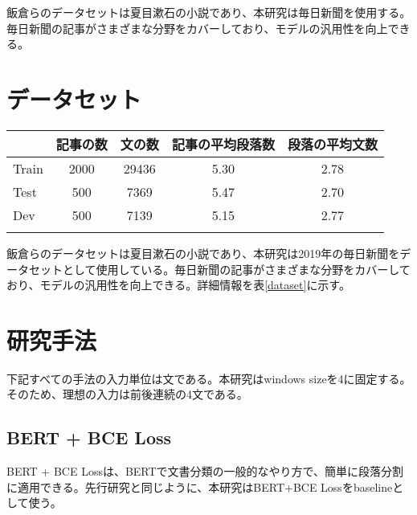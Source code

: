\documentclass[
  platex, dvipdfmx,  %
]{nlp2021}
\begin{document}
飯倉らのデータセットは夏目漱石の小説であり、本研究は毎日新聞を使用する。毎日新聞の記事がさまざまな分野をカバーしており、モデルの汎用性を向上できる。

\section{データセット}

\begin{table*}[t]
  \centering
  \small
  \caption{データセット}
  \begin{tabular}{lcccc}
  \hline
  \     & 記事の数 & 文の数   & 記事の平均段落数 & 段落の平均文数 \\
  \hline
  Train & 2000 & 29436 & 5.30        & 2.78       \\
  Test  & 500  & 7369  & 5.47        & 2.70       \\
  Dev   & 500  & 7139  & 5.15        & 2.77       \\
  \hline
  \label{dataset}
  \end{tabular}
  \end{table*}


飯倉らのデータセットは夏目漱石の小説であり、本研究は2019年の毎日新聞をデータセットとして使用している。毎日新聞の記事がさまざまな分野をカバーしており、モデルの汎用性を向上できる。詳細情報を表\ref{dataset}に示す。

%




\section{研究手法}

下記すべての手法の入力単位は文である。本研究はwindows sizeを4に固定する。そのため、理想の入力は前後連続の4文である。

\subsection{BERT + BCE Loss}

BERT + BCE Lossは、BERTで文書分類の一般的なやり方で、簡単に段落分割に適用できる。先行研究と同じように、本研究はBERT+BCE Lossをbaselineとして使う。
\end{document}
